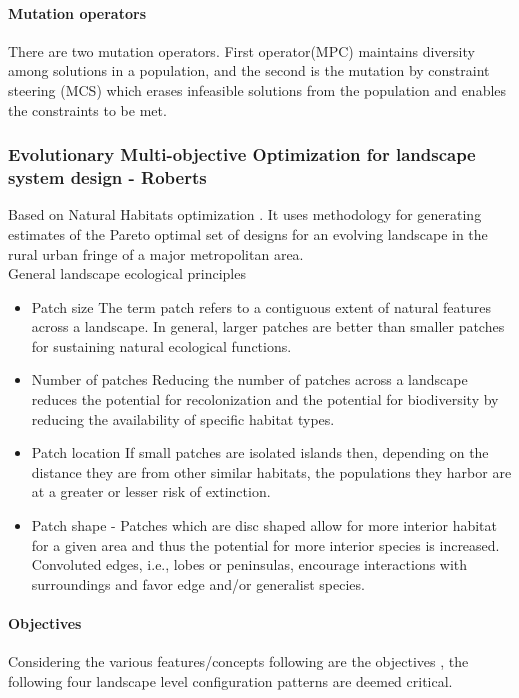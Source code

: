 \documentclass[12pt]{article} %
\begin{document}
\paragraph*{Mutation operators}
There are two mutation operators. First operator(MPC) maintains diversity among solutions in a population, and the second is the mutation by constraint steering (MCS) which erases infeasible solutions from the population and enables the constraints to be met. 

\subsubsection{Evolutionary Multi-objective Optimization for landscape system design - Roberts}
 Based on Natural Habitats optimization . It uses methodology for generating estimates of the Pareto optimal set of designs for an evolving landscape in the rural urban fringe of a major metropolitan area.\\
 General landscape ecological principles
\begin{itemize}
  \item Patch size The term patch refers to a contiguous extent of natural features across
a landscape. In general, larger patches are better than smaller patches for
sustaining natural ecological functions.
  \item Number of patches Reducing the number of patches across a landscape reduces
the potential for recolonization and the potential for biodiversity by reducing the
availability of specific habitat types.
  \item Patch location If small patches are isolated islands then, depending on the
distance they are from other similar habitats, the populations they harbor are at a
greater or lesser risk of extinction.
  \item Patch shape -  Patches which are disc shaped allow for more interior habitat for a
given area and thus the potential for more interior species is increased. Convoluted
edges, i.e., lobes or peninsulas, encourage interactions with surroundings and favor
edge and/or generalist species.
\end{itemize}

\paragraph*{Objectives}
Considering the various features/concepts following are the objectives ,  the following four landscape level configuration patterns are deemed critical.
\end{document}
